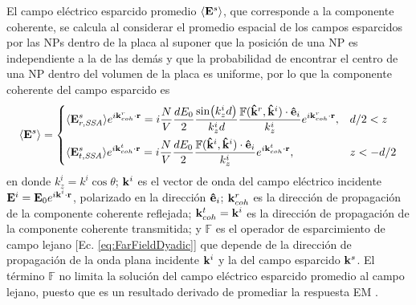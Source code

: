 El  campo eléctrico esparcido promedio $\langle \vb{E}^s\rangle$, que corresponde a la componente coherente, se calcula al considerar el promedio espacial de los campos esparcidos por las NPs dentro de la placa al suponer que la posición de una NP es independiente a la de las demás y que la probabilidad de encontrar el centro de una NP dentro del volumen de la placa es uniforme, por lo que la componente coherente del campo esparcido es  \cite{garcia2012multiple}
%
	\begin{align}
	\langle \vb{E}^s\rangle =
	\begin{dcases} 
	      \langle \vb{E}^s_{r,\textit{SSA}}\rangle e^{i\vb{k}^r_{coh}\cdot\vb{r}} =
	    			i \frac{N}{V}  \frac{d E_0}{2} \frac{\sin(k_z^id)}{k_z^i d} 
				\frac{\mathbb{F}(\vu{k}^r,\vu{k}^i)\cdot \vu{e}_i}{k_z^i }	e^{i\vb{k}^r_{coh}\cdot\vb{r}},		& d/2<z \\
      \langle \vb{E}^s_{t,\textit{SSA}}\rangle e^{i\vb{k}^t_{coh}\cdot\vb{r}} =
 				i\frac{N}{V} \frac{d E_0}{2}\frac{\mathbb{F}(\vu{k}^i,\vu{k}^i)\cdot \vu{e}_i}{k_z^i}		
				e^{i\vb{k}^t_{coh}\cdot\vb{r}},
							& z<-d/2
   \end{dcases}
   	\label{eq:AvErEt}
	\end{align}
%
en donde $k^i_z = k^i\cos\theta$; $\vb{k}^i$ es el vector de onda del campo eléctrico incidente $\vb{E}^i = \vb{E}_0 e^{i\vb{k}^i\cdot\vb{r}}$, polarizado en la dirección $\vu{e}_i$; $\vb{k}^r_{coh}$ es la dirección de propagación de la componente coherente reflejada; $\vb{k}^t_{coh}=\vb{k}^i$ es la dirección de propagación de la componente coherente transmitida; y $\mathbb{F}$  es el operador de esparcimiento de campo lejano [Ec. \eqref{eq:FarFieldDyadic}] que depende de la dirección de propagación de la onda plana incidente $\vb{k}^i$ y la del campo esparcido $\vb{k}^s$. El término $\mathbb{F}$ no limita la solución del campo eléctrico esparcido promedio al campo lejano, puesto que es un resultado derivado de promediar la respuesta EM \cite{gutierrez2012overview}.

